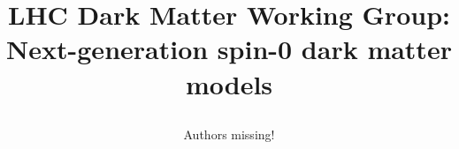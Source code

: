 \documentclass[a4paper, 11pt,notoc]{article}
\begin{document}
\title{\begin{boldmath} \huge LHC Dark Matter Working Group:  \\ Next-generation spin-0  dark matter models \vspace{7mm} \end{boldmath}}





\author[]{Authors missing!}











\end{document}
